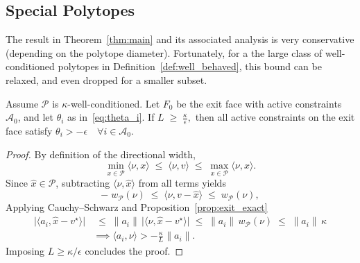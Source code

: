 \subsection{Special Polytopes}


The result in Theorem~\ref{thm:main} and its associated analysis is very conservative (depending on the polytope diameter). Fortunately, for a the large class of well-conditioned polytopes in Definition~\ref{def:well_behaved}, this bound can be relaxed, and even dropped for a smaller subset. 

\begin{corollary}
\label{cor:exit_well_conditioned}
Assume $\mathcal P$ is $\kappa$-well-conditioned.
Let $F_0$ be the exit face with active constraints $\mathcal A_0$, and let $\theta_i$ as in~\ref{eq:theta_i}. If $L \;\ge\; \frac{\kappa}{\epsilon},$ 
then all active constraints on the exit face satisfy
$
\theta_i > -\epsilon
\quad \forall i \in \mathcal A_0.
$
\end{corollary}
\begin{proof}
By definition of the directional width,
\[
\min_{x \in \mathcal P} \langle \nu, x \rangle
\;\le\;
\langle \nu, v \rangle
\;\le\;
\max_{x \in \mathcal P} \langle \nu, x \rangle.
\]
Since $\hat x \in \mathcal P$, subtracting $\langle \nu, \hat x \rangle$
from all terms yields
\[
-\;w_{\mathcal P}(\nu)
\;\le\;
\langle \nu, v - \hat x \rangle
\;\le\;
w_{\mathcal P}(\nu),
\]
Applying Cauchy--Schwarz and Proposition~\ref{prop:exit_exact}
\begin{align*}
\bigl|\langle a_i, \hat x - v^\star \rangle\bigr|
&\;\le\;
\|a_i\| \, \bigl|\langle \nu, \hat x - v^\star \rangle\bigr|
\;\le\;
\|a_i\| \, w_{\mathcal P}(\nu)
\;\le\;
\|a_i\| \, \kappa \\
&\implies \langle a_i, \nu \rangle > -\frac{\kappa}{L} \|a_i\|.
\end{align*}
Imposing $L \ge \kappa/\epsilon$ concludes the proof.
\end{proof}



